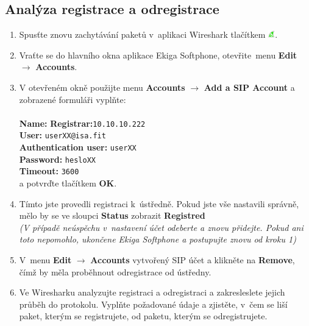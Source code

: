\subsection{Analýza registrace a odregistrace}
\begin{enumerate}
    \item Spusťte znovu zachytávání paketů v aplikaci Wireshark tlačítkem \includegraphics[width=3mm]{img/ws_start.png}.
    \item Vraťte se do hlavního okna aplikace Ekiga Softphone, otevřite menu {\bf Edit} $\rightarrow$ {\bf Accounts}.
    \item V otevřeném okně použijte menu {\bf Accounts} $\rightarrow$ {\bf Add a SIP Account} a zobrazené formuláři vyplňte: \\
    ~\\
    {\bf Name:} {\tt <Vaše jméno>}
    {\bf Registrar:}{\tt 10.10.10.222} \\
    {\bf User:} 	{\tt userXX@isa.fit} \\
    {\bf Authentication user:} 	{\tt userXX} \\
    {\bf Password:}	{\tt hesloXX} \\
    {\bf Timeout:} {\tt 3600}
    ~\\
    a potvrďte tlačítkem {\bf OK}.
    \item Tímto jste provedli registraci k ústředně. Pokud jste vše nastavili správně, mělo by se ve sloupci {\bf Status} zobrazit {\bf Registred} \\
    {\it (V případě neúspěchu v nastavení účet odeberte a znovu přidejte. Pokud ani toto nepomohlo, ukončene Ekiga Softphone a postupujte znovu od kroku 1)}
    \item V menu {\bf Edit} $\rightarrow$ {\bf Accounts} vytvořený SIP účet a klikněte na {\bf Remove}, čímž by měla proběhnout odregistrace od ústředny.
    \item Ve Wiresharku analyzujte registraci a odregistraci a zakresleslete jejich průběh do protokolu. Vyplňte požadované údaje a zjistěte, v čem se liší paket, kterým se registrujete, od paketu, kterým se odregistrujete.
\end{enumerate}



